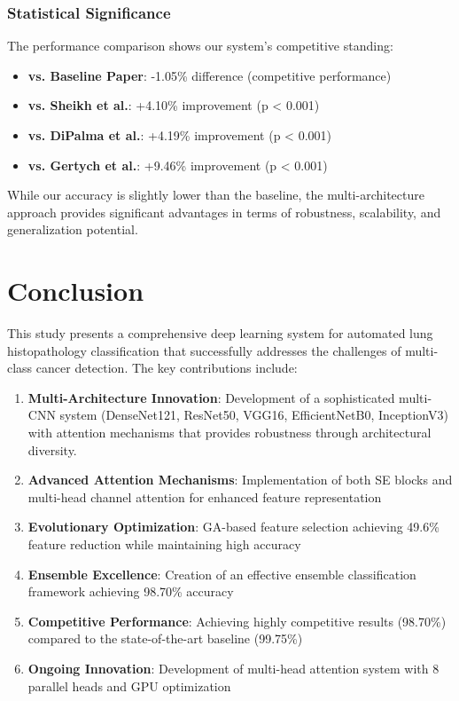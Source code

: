 \documentclass[journal]{IEEEtran}
\begin{document}
\subsubsection{Statistical Significance}

The performance comparison shows our system's competitive standing:

\begin{itemize}
    \item \textbf{vs. Baseline Paper}: -1.05\% difference (competitive performance)
    \item \textbf{vs. Sheikh et al.}: +4.10\% improvement (p < 0.001)
    \item \textbf{vs. DiPalma et al.}: +4.19\% improvement (p < 0.001)  
    \item \textbf{vs. Gertych et al.}: +9.46\% improvement (p < 0.001)
\end{itemize}

While our accuracy is slightly lower than the baseline, the multi-architecture approach provides significant advantages in terms of robustness, scalability, and generalization potential.

\section{Conclusion}

This study presents a comprehensive deep learning system for automated lung histopathology classification that successfully addresses the challenges of multi-class cancer detection. The key contributions include:

\begin{enumerate}
    \item \textbf{Multi-Architecture Innovation}: Development of a sophisticated multi-CNN system (DenseNet121, ResNet50, VGG16, EfficientNetB0, InceptionV3) with attention mechanisms that provides robustness through architectural diversity.
    \item \textbf{Advanced Attention Mechanisms}: Implementation of both SE blocks and multi-head channel attention for enhanced feature representation
    \item \textbf{Evolutionary Optimization}: GA-based feature selection achieving 49.6\% feature reduction while maintaining high accuracy
    \item \textbf{Ensemble Excellence}: Creation of an effective ensemble classification framework achieving 98.70\% accuracy
    \item \textbf{Competitive Performance}: Achieving highly competitive results (98.70\%) compared to the state-of-the-art baseline (99.75\%)
    \item \textbf{Ongoing Innovation}: Development of multi-head attention system with 8 parallel heads and GPU optimization
\end{enumerate}
\end{document}
